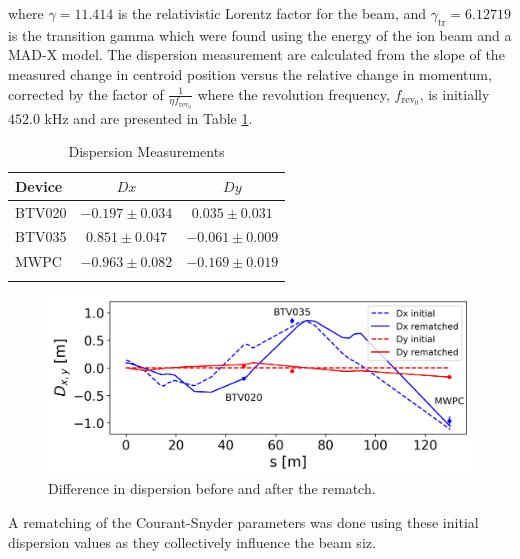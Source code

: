 \documentclass[a4paper,
               biblatex,     %
               ]{jacow}
\begin{document}
where $\gamma = 11.414$ is the relativistic Lorentz factor for the beam, and $\gamma_{\text{tr}} = 6.12719$ is the transition gamma which were found using the energy of the ion beam and a MAD-X model. The dispersion measurement are calculated from the slope of the measured change in centroid position versus the relative change in momentum, corrected by the factor of $\frac{1}{\eta f_{\text{rev}_0}}$ where the revolution frequency, $f_{\text{rev}_0}$, is initially $452.0$ kHz and are presented in Table \ref{tab:dispersion}.


\begin{table}[h!]
\centering
\caption{Dispersion Measurements}
\begin{tabular}{l c c}
\hline
Device & \(Dx\) & \(Dy\) \\
\hline
BTV020  & \(-0.197 \pm 0.034\) & \(0.035 \pm 0.031\) \\
BTV035  & \(0.851 \pm 0.047\) & \(-0.061 \pm 0.009\) \\
MWPC   & \(-0.963 \pm 0.082\) & \(-0.169 \pm 0.019\) \\
\hline
\label{tab:dispersion}
\end{tabular}
\end{table}


\begin{figure}[!htb]
   \centering
   \includegraphics*[width=1.0\columnwidth]{dispersion_diff.png}
   \caption{Difference in dispersion before and after the rematch.}
   \label{fig:dispersion}
\end{figure}

A rematching of the Courant-Snyder parameters was done using these initial dispersion values as they collectively influence the beam siz.
\end{document}
